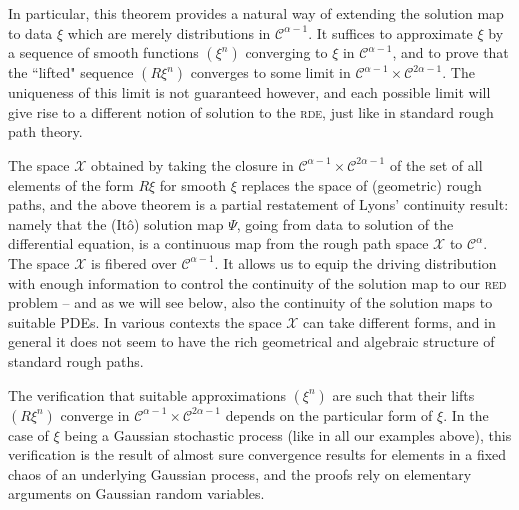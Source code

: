 \documentclass[11pt,a4paper]{article}
\theoremstyle{remark}
\newcommand{\CC}{\ensuremath{\mathscr{C}}}
\begin{document}
In particular, this theorem provides a natural way of extending the solution map to data $\xi$ which are merely distributions in $\CC^{\alpha-1}$. It suffices to approximate $\xi$ by a sequence of smooth functions $(\xi^n)$ converging to $\xi$ in $\CC^{\alpha-1}$, and to prove that the ``lifted" sequence $(R\xi^n)$ converges to some limit in $ \CC^{\alpha-1}\times\CC^{2\alpha-1}$. The uniqueness of this limit is not guaranteed however, and each possible limit will give rise to a different notion of solution to the \textsc{rde}, just like in standard rough path theory. 

The space $\mathcal{X}$ obtained by taking the closure in  $\CC^{\alpha-1}\times\CC^{2\alpha-1}$ of the set of all elements of the form $R\xi$ for smooth $\xi$ replaces the space of (geometric) rough paths, and the above theorem is a partial restatement of Lyons' continuity result: namely that the (It\^o) solution map $\Psi$, going from data to solution of the differential equation, is a continuous map from the rough path space $\mathcal{X}$ to $\CC^\alpha$. The space $\mathcal{X}$ is fibered over $\CC^{\alpha-1}$. It allows us to equip the driving distribution with enough information to control the continuity of the solution map to our \textsc{red} problem -- and as we will see below, also the continuity of the solution maps to suitable PDEs. In various contexts the space $\mathcal{X}$ can take different forms, and in general it does not seem to have the rich geometrical and algebraic structure of standard rough paths. 

The verification that suitable approximations $(\xi^n)$ are such that their lifts $(R\xi^n)$  converge in $ \CC^{\alpha-1}\times\CC^{2\alpha-1}$ depends on the particular form of $\xi$. In the case of $\xi$ being a Gaussian stochastic process (like in all our examples above), this verification is the result of almost sure convergence results for elements in a fixed chaos of an underlying Gaussian process, and the proofs rely on elementary arguments on Gaussian random variables.   
\end{document}
